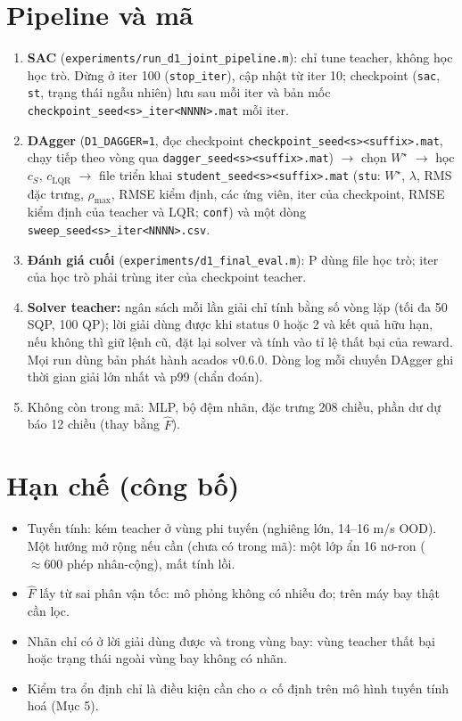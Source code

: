 \documentclass[11pt]{article}
\newcommand{\cS}{c_{S}}
\newcommand{\cL}{c_{\mathrm{LQR}}}
\begin{document}
\section{Pipeline và mã}
\begin{enumerate}[leftmargin=1.6em,itemsep=1pt]
\item \textbf{SAC} (\texttt{experiments/run\_d1\_joint\_pipeline.m}): chỉ tune teacher, không học học trò. Dừng ở iter 100
(\texttt{stop\_iter}), cập nhật từ iter 10; checkpoint (\texttt{sac}, \texttt{st}, trạng thái ngẫu nhiên) lưu sau mỗi iter và
bản mốc \texttt{checkpoint\_seed<s>\_iter<NNNN>.mat} mỗi iter.
\item \textbf{DAgger} (\texttt{D1\_DAGGER=1}, đọc checkpoint \texttt{checkpoint\_seed<s>\allowbreak<suffix>.mat}, chạy tiếp theo vòng
qua \texttt{dagger\_seed<s>\allowbreak<suffix>.mat}) $\to$ chọn $W^\star$ $\to$ học $\cS$, $\cL$ $\to$ file triển khai
\texttt{student\_seed<s>\allowbreak<suffix>.mat} (\texttt{stu}: $W^\star$, $\lambda$, RMS đặc trưng, $\rho_{\max}$, RMSE kiểm định, các
ứng viên, iter của checkpoint, RMSE kiểm định của teacher và LQR; \texttt{conf}) và một dòng
\texttt{sweep\_seed<s>\_iter<NNNN>.csv}.
\item \textbf{Đánh giá cuối} (\texttt{experiments/d1\_final\_eval.m}): P dùng file học trò; iter của học trò phải trùng
iter của checkpoint teacher.
\item \textbf{Solver teacher:} ngân sách mỗi lần giải chỉ tính bằng số vòng lặp (tối đa 50 SQP, 100 QP); lời giải dùng được
khi status 0 hoặc 2 và kết quả hữu hạn, nếu không thì giữ lệnh cũ, đặt lại solver và tính vào tỉ lệ thất bại của reward. Mọi
run dùng bản phát hành acados v0.6.0. Dòng log mỗi chuyến DAgger ghi thời gian giải lớn nhất và p99 (chẩn đoán).
\item Không còn trong mã: MLP, bộ đệm nhãn, đặc trưng 208 chiều, phần dư dự báo 12 chiều (thay bằng $\hat F$).
\end{enumerate}

\section{Hạn chế (công bố)}
\begin{itemize}[leftmargin=1.4em,itemsep=1pt]
\item Tuyến tính: kém teacher ở vùng phi tuyến (nghiêng lớn, 14--16 m/s OOD). Một hướng mở rộng nếu cần (chưa có trong mã):
một lớp ẩn 16 nơ-ron ($\approx600$ phép nhân-cộng), mất tính lồi.
\item $\hat F$ lấy từ sai phân vận tốc: mô phỏng không có nhiễu đo; trên máy bay thật cần lọc.
\item Nhãn chỉ có ở lời giải dùng được và trong vùng bay: vùng teacher thất bại hoặc trạng thái ngoài vùng bay không có nhãn.
\item Kiểm tra ổn định chỉ là điều kiện cần cho $\alpha$ cố định trên mô hình tuyến tính hoá (Mục 5).
\end{itemize}
\end{document}
